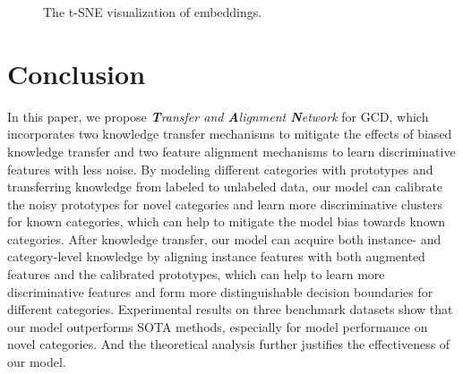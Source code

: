 \documentclass[letterpaper]{article} %
\begin{document}
\begin{figure}
\centering
{} \hspace{-10mm}
%
\centering
\caption{The t-SNE visualization of embeddings.}
\label{fig4}
\end{figure}











\section{Conclusion}
In this paper, we propose \textit{\textbf{T}ransfer and \textbf{A}lignment \textbf{N}etwork} for GCD, which incorporates two knowledge transfer mechanisms to mitigate the effects of biased knowledge transfer and two feature alignment mechanisms to learn discriminative features with less noise.
By modeling different categories with prototypes and transferring knowledge from labeled to unlabeled data, our model can calibrate the noisy prototypes for novel categories and learn more discriminative clusters for known categories, which can help to mitigate the model bias towards known categories.
After knowledge transfer, our model can acquire both instance- and category-level knowledge by aligning instance features with both augmented features and the calibrated prototypes, which can help to learn more discriminative features and form more distinguishable decision boundaries for different categories.
Experimental results on three benchmark datasets show that our model outperforms SOTA methods, especially for model performance on novel categories. And the theoretical analysis further justifies the effectiveness of our model.
\end{document}
